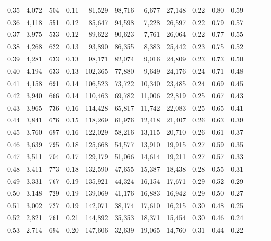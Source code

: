 \begin{tabular}{rrrrrrrrrrrrrr}
0.35 &  4,072 &  504 &  0.11 &   81,529 &   98,716 &   6,677 &  27,148 &  0.22 &  0.80 &      0.59 \\
0.36 &  4,118 &  551 &  0.12 &   85,647 &   94,598 &   7,228 &  26,597 &  0.22 &  0.79 &      0.57 \\
0.37 &  3,975 &  533 &  0.12 &   89,622 &   90,623 &   7,761 &  26,064 &  0.22 &  0.77 &      0.55 \\
0.38 &  4,268 &  622 &  0.13 &   93,890 &   86,355 &   8,383 &  25,442 &  0.23 &  0.75 &      0.52 \\
0.39 &  4,281 &  633 &  0.13 &   98,171 &   82,074 &   9,016 &  24,809 &  0.23 &  0.73 &      0.50 \\
0.40 &  4,194 &  633 &  0.13 &  102,365 &   77,880 &   9,649 &  24,176 &  0.24 &  0.71 &      0.48 \\
0.41 &  4,158 &  691 &  0.14 &  106,523 &   73,722 &  10,340 &  23,485 &  0.24 &  0.69 &      0.45 \\
0.42 &  3,940 &  666 &  0.14 &  110,463 &   69,782 &  11,006 &  22,819 &  0.25 &  0.67 &      0.43 \\
0.43 &  3,965 &  736 &  0.16 &  114,428 &   65,817 &  11,742 &  22,083 &  0.25 &  0.65 &      0.41 \\
0.44 &  3,841 &  676 &  0.15 &  118,269 &   61,976 &  12,418 &  21,407 &  0.26 &  0.63 &      0.39 \\
0.45 &  3,760 &  697 &  0.16 &  122,029 &   58,216 &  13,115 &  20,710 &  0.26 &  0.61 &      0.37 \\
0.46 &  3,639 &  795 &  0.18 &  125,668 &   54,577 &  13,910 &  19,915 &  0.27 &  0.59 &      0.35 \\
0.47 &  3,511 &  704 &  0.17 &  129,179 &   51,066 &  14,614 &  19,211 &  0.27 &  0.57 &      0.33 \\
0.48 &  3,411 &  773 &  0.18 &  132,590 &   47,655 &  15,387 &  18,438 &  0.28 &  0.55 &      0.31 \\
0.49 &  3,331 &  767 &  0.19 &  135,921 &   44,324 &  16,154 &  17,671 &  0.29 &  0.52 &      0.29 \\
0.50 &  3,148 &  729 &  0.19 &  139,069 &   41,176 &  16,883 &  16,942 &  0.29 &  0.50 &      0.27 \\
0.51 &  3,002 &  727 &  0.19 &  142,071 &   38,174 &  17,610 &  16,215 &  0.30 &  0.48 &      0.25 \\
0.52 &  2,821 &  761 &  0.21 &  144,892 &   35,353 &  18,371 &  15,454 &  0.30 &  0.46 &      0.24 \\
0.53 &  2,714 &  694 &  0.20 &  147,606 &   32,639 &  19,065 &  14,760 &  0.31 &  0.44 &      0.22 \\

\end{tabular}
